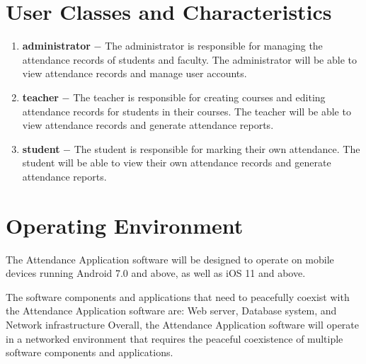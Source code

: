 \documentclass{scrreprt}
\begin{document}
\section{User Classes and Characteristics}
\begin{enumerate}
    \item \textbf{administrator} $-$ The administrator is responsible for managing the attendance records of students and faculty. The administrator will be able to view attendance records and manage user accounts.
    \item \textbf{teacher} $-$ The teacher is responsible for creating courses and editing attendance records for students in their courses. The teacher will be able to view attendance records and generate attendance reports.
    \item \textbf{student} $-$ The student is responsible for marking their own attendance. The student will be able to view their own attendance records and generate attendance reports. 
\end{enumerate}

\section{Operating Environment}
The Attendance Application software will be designed to operate on mobile devices running Android 7.0 and above, as well as iOS 11 and above.

The software components and applications that need to peacefully coexist with the Attendance Application software are: Web server, Database system, and Network infrastructure
Overall, the Attendance Application software will operate in a networked environment that requires the peaceful coexistence of multiple software components and applications.
\end{document}
